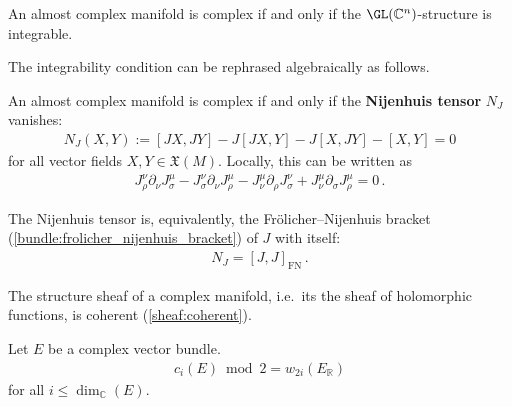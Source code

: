     \begin{property}
        An almost complex manifold is complex if and only if the $\GL(\mathbb{C}^n)$-structure is integrable.
    \end{property}
    The integrability condition can be rephrased algebraically as follows.
    \begin{theorem}
        An almost complex manifold is complex if and only if the \textbf{Nijenhuis tensor} $N_J$ vanishes:
        \begin{gather}
            \label{complex:integrable_structure}
            N_J(X,Y) := [JX,JY] - J[JX,Y] - J[X,JY] - [X,Y] = 0
        \end{gather}
        for all vector fields $X,Y\in\mathfrak{X}(M)$. Locally, this can be written as
        \begin{gather}
            J_\rho^\nu\partial_\nu J_\sigma^\mu - J_\sigma^\nu\partial_\nu J_\rho^\mu - J_\nu^\mu\partial_\rho J_\sigma^\nu + J_\nu^\mu\partial_\sigma J_\rho^\mu = 0\,.
        \end{gather}
    \end{theorem}
    \begin{property}
        The Nijenhuis tensor is, equivalently, the Fr\"olicher--Nijenhuis bracket (\cref{bundle:frolicher_nijenhuis_bracket}) of $J$ with itself:
        \begin{gather}
            N_J = [J,J]_{\text{FN}}\,.
        \end{gather}
    \end{property}

    \begin{theorem}
        The structure sheaf of a complex manifold, i.e.~its the sheaf of holomorphic functions, is coherent (\cref{sheaf:coherent}).
    \end{theorem}

    \begin{property}\label{complex:stiefel_whitney}
        Let $E$ be a complex vector bundle.
        \begin{gather}
            c_i(E)\bmod2 = w_{2i}(E_{\mathbb{R}})
        \end{gather}
        for all $i\leq\dim_{\mathbb{C}}(E)$.
    \end{property}

